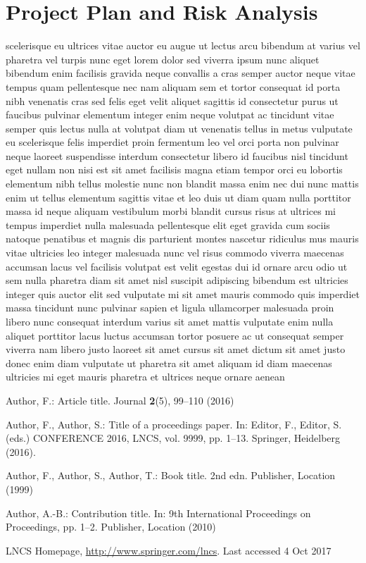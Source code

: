 \documentclass[runningheads]{llncs}
\begin{document}
\section{Project Plan and Risk Analysis}
    scelerisque eu ultrices vitae auctor eu augue ut lectus arcu bibendum at varius vel pharetra vel turpis nunc eget lorem dolor sed viverra ipsum nunc aliquet bibendum enim facilisis gravida neque convallis a cras semper auctor neque vitae tempus quam pellentesque nec nam aliquam sem et tortor consequat id porta nibh venenatis cras sed felis eget velit aliquet sagittis id consectetur purus ut faucibus pulvinar elementum integer enim neque volutpat ac tincidunt vitae semper quis lectus nulla at volutpat diam ut venenatis tellus in metus vulputate eu scelerisque felis imperdiet proin fermentum leo vel orci porta non pulvinar neque laoreet suspendisse interdum consectetur libero id faucibus nisl tincidunt eget nullam non nisi est sit amet facilisis magna etiam tempor orci eu lobortis elementum nibh tellus molestie nunc non blandit massa enim nec dui nunc mattis enim ut tellus elementum sagittis vitae et leo duis ut diam quam nulla porttitor massa id neque aliquam vestibulum morbi blandit cursus risus at ultrices mi tempus imperdiet nulla malesuada pellentesque elit eget gravida cum sociis natoque penatibus et magnis dis parturient montes nascetur ridiculus mus mauris vitae ultricies leo integer malesuada nunc vel risus commodo viverra maecenas accumsan lacus vel facilisis volutpat est velit egestas dui id ornare arcu odio ut sem nulla pharetra diam sit amet nisl suscipit adipiscing bibendum est ultricies integer quis auctor elit sed vulputate mi sit amet mauris commodo quis imperdiet massa tincidunt nunc pulvinar sapien et ligula ullamcorper malesuada proin libero nunc consequat interdum varius sit amet mattis vulputate enim nulla aliquet porttitor lacus luctus accumsan tortor posuere ac ut consequat semper viverra nam libero justo laoreet sit amet cursus sit amet dictum sit amet justo donec enim diam vulputate ut pharetra sit amet aliquam id diam maecenas ultricies mi eget mauris pharetra et ultrices neque ornare aenean

\begin{thebibliography}{8}
    Author, F.: Article title. Journal \textbf{2}(5), 99--110 (2016)
    
    Author, F., Author, S.: Title of a proceedings paper. In: Editor,
    F., Editor, S. (eds.) CONFERENCE 2016, LNCS, vol. 9999, pp. 1--13.
    Springer, Heidelberg (2016). 
    
    Author, F., Author, S., Author, T.: Book title. 2nd edn. Publisher,
    Location (1999)
    
    Author, A.-B.: Contribution title. In: 9th International Proceedings
    on Proceedings, pp. 1--2. Publisher, Location (2010)
    
    LNCS Homepage, \url{http://www.springer.com/lncs}. Last accessed 4
    Oct 2017
\end{thebibliography}
\end{document}
